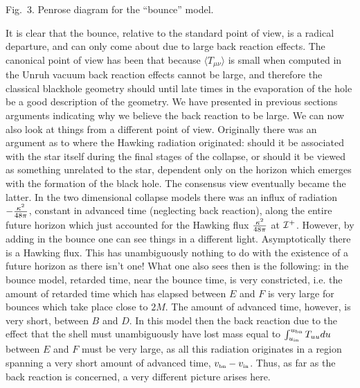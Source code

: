 \centerline {Fig.~3. Penrose diagram for the  ``bounce'' model.}
\endinsert
It is clear that the bounce, relative to the standard point of view, is
a radical departure, and can only come about due to large back reaction
effects. The canonical point of view has been that because $\langle
T_{\mu\nu}\rangle$ is small when computed in the Unruh vacuum back
reaction effects cannot be large, and therefore the classical blackhole
geometry should until late times in the evaporation of the hole be a
good description of the geometry. We have presented in previous
sections arguments indicating why we believe the back reaction to be
large. We can now also look at things from a different point of view.
Originally there was an argument as to where the Hawking radiation
originated: should it be associated with the star itself during the
final stages of the collapse, or should it be viewed as something
unrelated to the star, dependent only on the horizon which emerges with
the formation of the black hole. The consensus view eventually became
the latter. In the two dimensional collapse models there was an influx
of radiation $-{\kappa^2\over48\pi}$, constant in advanced time (neglecting
back reaction), along the entire future horizon which just accounted
for the Hawking flux ${\kappa^2\over48\pi}$ at ${\cal I}^+$.  However, by
adding in the bounce one can see things in a different light.
Asymptotically there is a Hawking flux. This has unambiguously nothing
to do with the existence of a future horizon as there isn't one! What
one also sees then is the following: in the bounce model, retarded
time, near the bounce time, is very constricted, i.e. the amount of
retarded time which has elapsed between $E$ and $F$ is very large for
bounces which take place close to $2M$. The amount of advanced time,
however, is very short, between $B$ and $D$. In this model then the
back reaction due to the effect that the shell must unambiguously have
lost mass equal to $\int^{u_{\scriptscriptstyle{\rm bn}}}_{u_{\scriptscriptstyle{\rm in}}}T_{uu}du$ between $E$ and $F$
must be very large, as all this radiation originates in a region
spanning a very short amount of advanced time, $v_{\scriptscriptstyle{\rm bn}}-v_{\scriptscriptstyle{\rm in}}$.  Thus, as
far as the back reaction is concerned, a very different picture arises
here.

